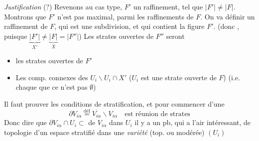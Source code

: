 \documentclass[11pt,a4paper]{article}
\begin{document}
\emph{Justification} (?) Revenons au cas type,  $F'$ un raffinement, tel que $|F'| \neq |F|$. Montrons que $F'$ n'est pas  maximal, parmi les raffinements de $F$. On va définir un raffinement   de $F$, qui est \struck{\ill{}} une subdivision, et qui contient la figure $F'$. (donc , puisque $\underbrace{|F'|}_{X'} \neq \underbrace{|F|}_{X} = |F''|$) Les  strates ouvertes de $F''$ seront
\begin{itemize}
  \item[a)] les strates  ouvertes de $F'$
  \item[b)] Les comp. connexes  des \struck{\ill{}} $U_i \smallsetminus U_i \cap X'$ ($U_i$ est une strate ouverte de $F$) (i.e. chaque  que ce n'est pas $\emptyset$)
\end{itemize}
Il faut prouver les conditions \struck{\ill{}} de stratification, et pour commencer \struck{\ill{}} d'une
\[
  \partial V_{i\alpha} \overset{\mathrm{déf}}{=} \overline{V_{i\alpha}} \smallsetminus V_{i\alpha} \quad \text{est réunion de strates}
\]
Donc dire que $\partial V_{i\alpha} \cap U_i \subset$  de $V_{i\alpha}$ dans $U_i$  il y a un pb, qui a l'air intéressant, de topologie d'un espace stratifié  dans une \emph{variété} (top. ou modérée) $(U_i)$

\end{document}
